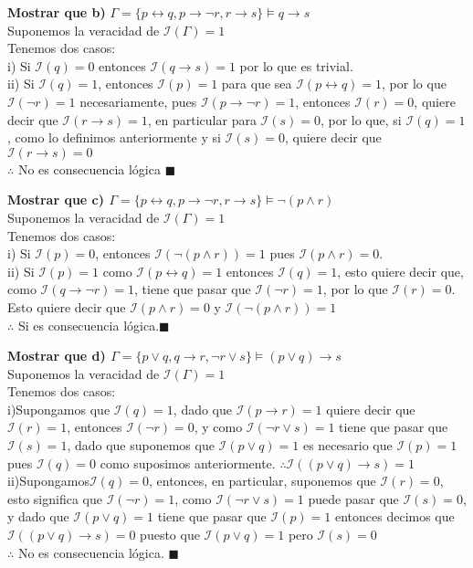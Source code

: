 \textbf{Mostrar que b)} $\Gamma = \{p\leftrightarrow q,p\rightarrow \neg r,r\rightarrow s\} \vDash q\rightarrow s$\\
Suponemos la veracidad de $\mathcal{I}(\Gamma)=1$\\
Tenemos dos casos:\\
 \indent i) Si $\mathcal{I}(q)=0$ entonces $\mathcal{I}(q\rightarrow s)=1$ por lo que es trivial.\\
\indent ii) Si $\mathcal{I}(q)=1$, entonces $\mathcal{I}(p)=1$ para que sea $\mathcal{I}(p\leftrightarrow q)=1$, por lo que $\mathcal{I}(\neg r)=1$ necesariamente, pues $\mathcal{I}(p\rightarrow \neg r)=1$, entonces $\mathcal{I}(r)=0$, quiere decir que $\mathcal{I}(r\rightarrow s)=1$, en particular para $\mathcal{I}(s)=0$, por lo que, si $\mathcal{I}(q)=1$, como lo definimos anteriormente y si $\mathcal{I}(s)=0$, quiere decir que $\mathcal{I}(r\rightarrow s)=0$\\
$\therefore$ No es consecuencia lógica $\blacksquare$


\textbf{Mostrar que c) $\Gamma = \{p\leftrightarrow q,p\rightarrow \neg r,r\rightarrow s\} \vDash \neg (p\land r)$}\\
Suponemos la veracidad de $\mathcal{I}(\Gamma)=1$\\
Tenemos dos casos:\\
\indent i) Si $\mathcal{I}(p)=0$, entonces $\mathcal{I}(\neg(p\land r))=1$ pues $\mathcal{I}(p\land r)=0$.\\
\indent ii) Si $\mathcal{I}(p)=1$ como $\mathcal{I}(p \leftrightarrow q)=1$ entonces $\mathcal{I}(q)=1$, esto quiere decir que, como $\mathcal{I}(q\rightarrow \neg r)=1$, tiene que pasar que $\mathcal{I}(\neg r)=1$, por lo que $\mathcal{I}(r)=0$.\\
Esto quiere decir que $\mathcal{I}(p\land r)=0$ y $\mathcal{I}(\neg (p\land r))=1$\\
$\therefore$ Si es consecuencia lógica.$\blacksquare$


\textbf{Mostrar que d) $\Gamma = \{p\lor q, q\rightarrow r, \neg r \lor s\}\vDash(p\lor q)\rightarrow s$}\\
Suponemos la veracidad de $\mathcal{I}(\Gamma)=1$\\
Tenemos dos casos:\\
\indent i)Supongamos que $\mathcal{I}(q)=1$, dado que $\mathcal{I}(p\rightarrow r)=1$ quiere decir que $\mathcal{I}(r)=1$, entonces $\mathcal{I}(\neg r)=0$, y como $\mathcal{I}(\neg r\lor s)=1$ tiene que pasar que $\mathcal{I}(s)=1$, dado que suponemos que $\mathcal{I}(p\lor q)=1$ es necesario que $\mathcal{I}(p)=1$ pues $\mathcal{I}(q)=0$ como suposimos anteriormente. $\therefore\mathcal{I}((p\lor q)\rightarrow s)=1$\\
\indent ii)Supongamos$\mathcal{I}(q)=0$, entonces, en particular, suponemos que $\mathcal{I}(r)=0$, esto significa que $\mathcal{I}(\neg r)=1$, como $\mathcal{I}(\neg r \lor s)=1$ puede pasar que $\mathcal{I}(s)=0$, y dado que $\mathcal{I}(p\lor q)=1$ tiene que pasar que $\mathcal{I}(p)=1$ entonces decimos que $\mathcal{I}((p\lor q)\rightarrow s)=0$ puesto que $\mathcal{I}(p\lor q)=1$ pero $\mathcal{I}(s)=0$\\
$\therefore$ No es consecuencia lógica. $\blacksquare$


